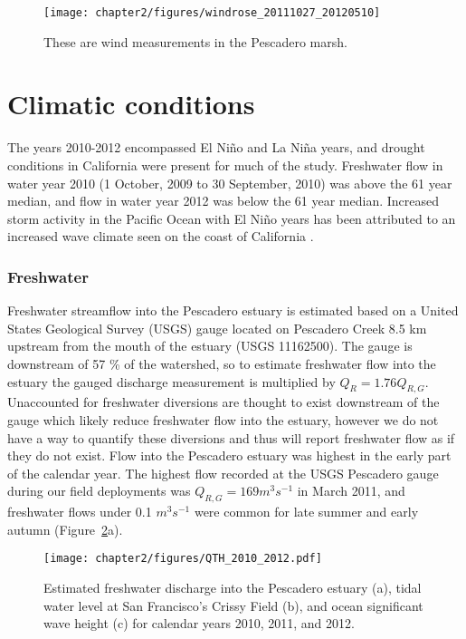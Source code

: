  \begin{figure}
 	\begin{center}
 		\texttt{[image: chapter2/figures/windrose\_20111027\_20120510]} \caption{These are wind measurements in the Pescadero marsh.} \label{fig:metstn_pdo_windrose} 
 	\end{center}
 \end{figure}

\section{Climatic conditions} \label{conditions_label}

The years 2010-2012 encompassed El Ni\~{n}o and La Ni\~{n}a years, and drought conditions in California were present for much of the study. Freshwater flow in water year 2010 (1 October, 2009 to 30 September, 2010) was above the 61 year median, and flow in water year 2012 was below the 61 year median. Increased storm activity in the Pacific Ocean with El Ni\~{n}o years has been attributed to an increased wave climate seen on the coast of California \parencite{seymour_influence_1984}. 



\subsubsection{Freshwater}
Freshwater streamflow into the Pescadero estuary is estimated based on a United States Geological Survey (USGS) gauge located on Pescadero Creek 8.5 km upstream from the mouth of the estuary (USGS 11162500). The gauge is downstream of 57 \% of the watershed, so to estimate freshwater flow into the estuary the gauged discharge measurement is multiplied by $Q_R = 1.76Q_{R,G}$. Unaccounted for freshwater diversions are thought to exist downstream of
the gauge which likely reduce freshwater flow into the estuary, however we do not have a way to quantify these diversions and thus will report freshwater flow as if they do not exist. Flow into the Pescadero estuary was highest in the early part of the calendar year. The highest flow recorded at the USGS Pescadero gauge during our field deployments was $Q_{R,G} = 169 m^{3} s^{-1}$ in March 2011, and freshwater flows under 0.1 $m^{3} s^{-1}$ were common for late summer and early autumn (Figure~\ref{fig:QTH_2010_2012}a).


\begin{figure}
	\begin{center}
		\texttt{[image: chapter2/figures/QTH\_2010\_2012.pdf]} \caption{Estimated freshwater discharge into the Pescadero estuary (a), tidal water level at San Francisco's Crissy Field (b), and ocean significant wave height (c) for calendar years 2010, 2011, and 2012.}\label{fig:QTH_2010_2012}  
	\end{center}
\end{figure}


